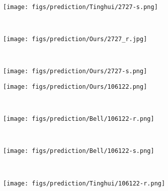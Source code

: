 \documentclass[10pt,twocolumn,letterpaper]{article}
\begin{document}
\begin{figure*}[ptb]
\begin{subfigure}[b]{0.135\textwidth}
    \end{subfigure} \hspace*{-0.8em}
    ~    
    \begin{subfigure}[b]{0.135\textwidth}
        \texttt{[image: figs/prediction/Tinghui/2727-s.png]}
    \end{subfigure}   \hspace*{-0.8em}
    ~
    \begin{subfigure}[b]{0.135\textwidth}
        \texttt{[image: figs/prediction/Ours/2727\_r.jpg]}
    \end{subfigure}   \hspace*{-0.8em}
    ~    
    \begin{subfigure}[b]{0.135\textwidth}
        \texttt{[image: figs/prediction/Ours/2727-s.png]}
    \end{subfigure} 
	 \begin{subfigure}[b]{0.135\textwidth}
        \texttt{[image: figs/prediction/Ours/106122.png]}
    \end{subfigure} \hspace*{-0.8em}
    ~
    \begin{subfigure}[b]{0.135\textwidth}
        \texttt{[image: figs/prediction/Bell/106122-r.png]}
    \end{subfigure} \hspace*{-0.8em}
    ~
    \begin{subfigure}[b]{0.135\textwidth}
        \texttt{[image: figs/prediction/Bell/106122-s.png]}
    \end{subfigure} \hspace*{-0.8em}
    ~
    \begin{subfigure}[b]{0.135\textwidth}
        \texttt{[image: figs/prediction/Tinghui/106122-r.png]}
    \end{subfigure} \hspace*{-0.8em}

\end{figure*}
\end{document}
